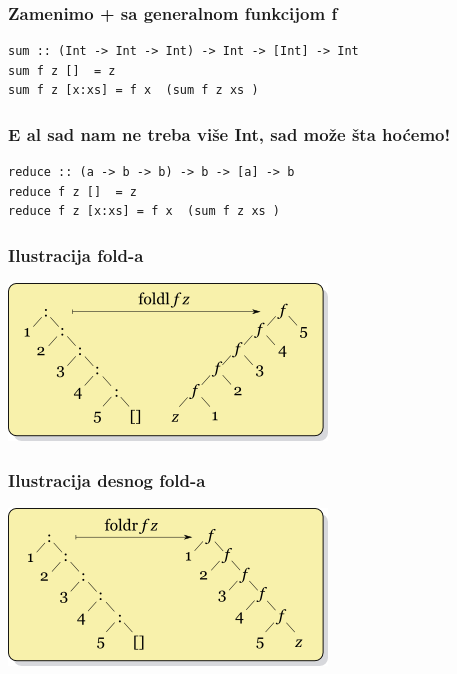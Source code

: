 \documentclass{beamer}
\begin{document}
\begin{frame}[fragile]
  \frametitle{Zamenimo + sa generalnom funkcijom f}
  \begin{lstlisting}
sum :: (Int -> Int -> Int) -> Int -> [Int] -> Int
sum f z []  = z
sum f z [x:xs] = f x  (sum f z xs )
  \end{lstlisting}
\end{frame}


\begin{frame}[fragile]
  \frametitle{E al sad nam ne treba više Int, sad može šta hoćemo!}
  \begin{lstlisting}
reduce :: (a -> b -> b) -> b -> [a] -> b
reduce f z []  = z
reduce f z [x:xs] = f x  (sum f z xs )
  \end{lstlisting}
\end{frame}



\begin{frame}
  \frametitle{Ilustracija fold-a}
  \includegraphics[width=\textwidth]{png/foldl.png}
\end{frame}

\begin{frame}
  \frametitle{Ilustracija desnog fold-a}
  \includegraphics[width=\textwidth]{png/foldr.png}
\end{frame}
\end{document}
